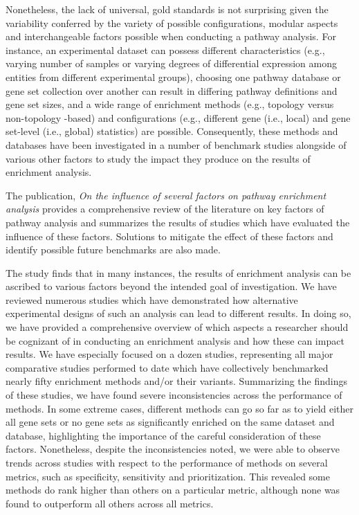 Nonetheless, the lack of universal, gold standards is not surprising given the variability conferred by the variety of possible configurations, modular aspects and interchangeable factors possible when conducting a pathway analysis. For instance, an experimental dataset can possess different characteristics (e.g., varying number of samples or varying degrees of differential expression among entities from different experimental groups), choosing one pathway database or gene set collection over another can result in differing pathway definitions and gene set sizes, and a wide range of enrichment methods (e.g., topology versus non-topology -based) and configurations (e.g., different gene (i.e., local) and gene set-level (i.e., global) statistics) are possible. Consequently, these methods and databases have been investigated in a number of benchmark studies alongside of various other factors to study the impact they produce on the results of enrichment analysis. 

The publication, \textit{On the influence of several factors on pathway enrichment analysis}  provides a comprehensive review of the literature on key factors of pathway analysis and summarizes the results of studies which have evaluated the influence of these factors. Solutions to mitigate the effect of these factors and identify possible future benchmarks are also made.

The study finds that in many instances, the results of enrichment analysis can be ascribed to various factors beyond the intended goal of investigation. We have reviewed numerous studies which have demonstrated how alternative experimental designs of such an analysis can lead to different results. In doing so, we have provided a comprehensive overview of which aspects a researcher should be cognizant of in conducting an enrichment analysis and how these can impact results. We have especially focused on a dozen studies, representing all major comparative studies performed to date which have collectively benchmarked nearly fifty enrichment methods and/or their variants. Summarizing the findings of these studies, we have found severe inconsistencies across the performance of methods. In some extreme cases, different methods can go so far as to yield either all gene sets or no gene sets as significantly enriched on the same dataset and database, highlighting the importance of the careful consideration of these factors. Nonetheless, despite the inconsistencies noted, we were able to observe trends across studies with respect to the performance of methods on several metrics, such as specificity, sensitivity and prioritization. This revealed some methods do rank higher than others on a particular metric, although none was found to outperform all others across all metrics. 


